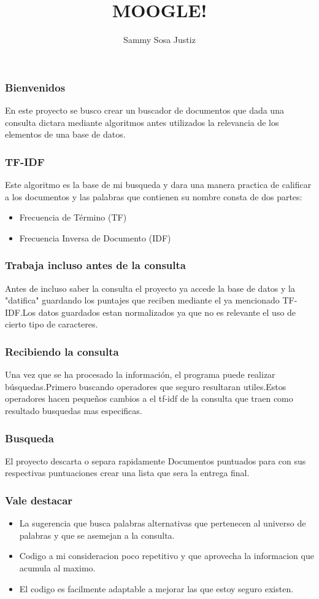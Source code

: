 \documentclass{beamer}
\title{MOOGLE!}
\author{Sammy Sosa Justiz}
\begin{document}
\begin{frame}
  \titlepage
\end{frame}


\begin{frame}
  \frametitle{Bienvenidos}
  En este proyecto se busco crear un buscador de documentos que dada una consulta dictara mediante algoritmos antes utilizados la relevancia de los elementos de una base de datos.
\end{frame}

\begin{frame}
    \frametitle{TF-IDF}
    Este algoritmo es la base de mi busqueda y dara una manera practica de calificar a los documentos y las palabras que contienen su nombre consta de dos partes:

    \begin{itemize}
        \item Frecuencia de Término (TF)
        \item Frecuencia Inversa de Documento (IDF)
    \end{itemize}
\end{frame}

    
\begin{frame}
    \frametitle{Trabaja incluso antes de la consulta}
  	Antes de incluso saber la consulta el proyecto ya accede la base de datos y la "datifica" guardando los puntajes que reciben mediante el ya mencionado TF-IDF.Los datos guardados estan normalizados ya que no es relevante el uso de cierto tipo de caracteres.
\end{frame}

\begin{frame}
    \frametitle{Recibiendo la consulta}
    Una vez que se ha procesado la información, el programa puede realizar búsquedas.Primero buscando operadores que seguro resultaran utiles.Estos operadores hacen pequeños cambios a el tf-idf de la consulta que traen como resultado busquedas mas especificas.
\end{frame}
    
\begin{frame}
    \frametitle{Busqueda}
    El proyecto descarta o separa rapidamente Documentos puntuados para con sus respectivas puntuaciones crear una lista que sera la entrega final.
\end{frame}

\begin{frame}
    \frametitle{Vale destacar}
        \begin{itemize}
            \item La sugerencia que busca palabras alternativas que pertenecen al universo de palabras y que se asemejan a la consulta.
            \item Codigo a mi consideracion poco repetitivo y que aprovecha la informacion que acumula al maximo.
            \item El codigo es facilmente adaptable a mejorar las que estoy seguro existen.
        \end{itemize}
\end{frame}
  
\end{document}
